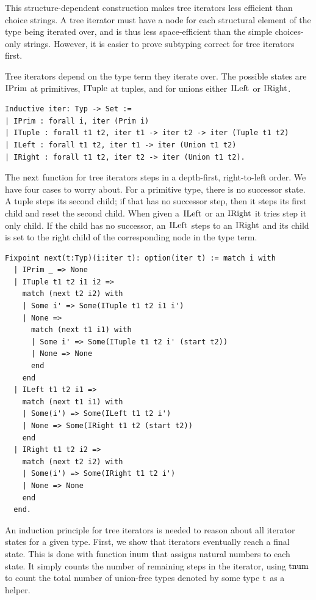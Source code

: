 \documentclass[a4paper,english]{lipics-v2019}
\renewcommand{\c}[1]{\ensuremath{\text{\lstinline{#1}}}\xspace}
\begin{document}
\noindent
This structure-dependent construction makes tree iterators less efficient
than choice strings. A tree iterator must have a node for each structural
element of the type being iterated over, and is thus less space-efficient
than the simple choices-only strings. However, it is easier to prove
subtyping correct for tree iterators first.

Tree iterators depend on the type term they iterate over. The possible
states are \c{IPrim} at primitives, \c{ITuple} at tuples, and for unions
either \c{ILeft} or \c{IRight}.

\begin{lstlisting}
Inductive iter: Typ -> Set :=
| IPrim : forall i, iter (Prim i)
| ITuple : forall t1 t2, iter t1 -> iter t2 -> iter (Tuple t1 t2)
| ILeft : forall t1 t2, iter t1 -> iter (Union t1 t2)
| IRight : forall t1 t2, iter t2 -> iter (Union t1 t2).
\end{lstlisting}

\noindent
The \c{next} function for tree iterators steps in a depth-first,
right-to-left order.  We have four cases to worry about. For a primitive
type, there is no successor state. A tuple steps its second child; if that
has no successor step, then it steps its first child and reset the second
child. When given a \c{ILeft} or an \c{IRight} it tries step it only
child. If the child has no successor, an \c{ILeft} steps to an \c{IRight}
and its child is set to the right child of the corresponding node in the
type term.

\begin{lstlisting}
Fixpoint next(t:Typ)(i:iter t): option(iter t) := match i with
  | IPrim _ => None
  | ITuple t1 t2 i1 i2 =>
    match (next t2 i2) with
    | Some i' => Some(ITuple t1 t2 i1 i')
    | None =>
      match (next t1 i1) with
      | Some i' => Some(ITuple t1 t2 i' (start t2))
      | None => None
      end
    end
  | ILeft t1 t2 i1 =>
    match (next t1 i1) with
    | Some(i') => Some(ILeft t1 t2 i')
    | None => Some(IRight t1 t2 (start t2))
    end
  | IRight t1 t2 i2 => 
    match (next t2 i2) with
    | Some(i') => Some(IRight t1 t2 i')
    | None => None
    end
  end.
\end{lstlisting}

\noindent
An induction principle for tree iterators is needed to reason about all
iterator states for a given type. First, we show that iterators eventually
reach a final state. This is done with function \c{inum} that assigns
natural numbers to each state. It simply counts the number of remaining
steps in the iterator, using \c{tnum} to count the total number of
union-free types denoted by some type \c{t} as a helper.
\end{document}
